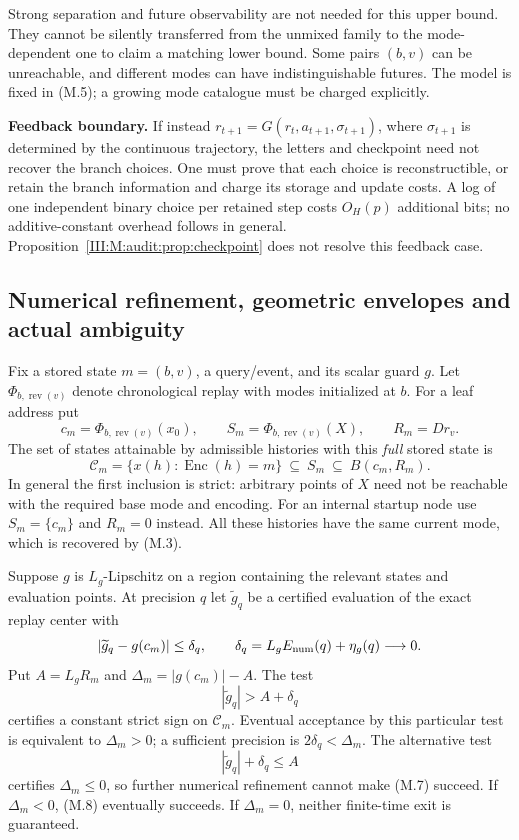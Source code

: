 Strong separation and future observability are not needed for this upper
bound. They cannot be silently transferred from the unmixed family to the
mode-dependent one to claim a matching lower bound. Some pairs $(b,v)$ can
be unreachable, and different modes can have indistinguishable futures.
The model is fixed in (M.5); a growing mode catalogue must be charged explicitly.

\textbf{Feedback boundary.} If instead
$r_{t+1}=G(r_t,a_{t+1},\sigma_{t+1})$, where $\sigma_{t+1}$ is determined
by the continuous trajectory, the letters and checkpoint need not recover
the branch choices. One must prove that each choice is reconstructible,
or retain the branch information and charge its storage and update costs.
A log of one independent binary choice per retained step costs
$O_H(p)$ additional bits; no additive-constant overhead follows in general.
Proposition~\ref{III:M:audit:prop:checkpoint} does not resolve this feedback case.

\subsection{Numerical refinement, geometric envelopes and actual ambiguity}
Fix a stored state $m=(b,v)$, a query/event, and its scalar guard $g$.
Let $\Phi_{b,\operatorname{rev}(v)}$ denote chronological replay with modes
initialized at $b$. For a leaf address put
\[
 c_m=\Phi_{b,\operatorname{rev}(v)}(x_0),\qquad
 S_m=\Phi_{b,\operatorname{rev}(v)}(X),\qquad R_m=Dr_v.
\]
The set of states attainable by admissible histories with this \emph{full}
stored state is
\[
 \mathcal C_m=\{x(h):\operatorname{Enc}(h)=m\}
       \ \subseteq\ S_m\ \subseteq\ B(c_m,R_m).       \tag{M.6}
\]
In general the first inclusion is strict: arbitrary points of $X$ need not
be reachable with the required base mode and encoding. For an internal
startup node use $S_m=\{c_m\}$ and $R_m=0$ instead. All these histories
have the same current mode, which is recovered by (M.3).

\begin{lemma}
\label{III:M:audit:lem:guard}
Suppose $g$ is $L_g$-Lipschitz on a region containing the relevant states and
evaluation points. At precision $q$ let $\widetilde g_q$ be a certified
evaluation of the exact replay center with
\[
 |\widetilde g_q-g(c_m)|\le\delta_q,
 \qquad \delta_q=L_gE_{\rm num}(q)+\eta_g(q)\longrightarrow0.
\]
Put $A=L_gR_m$ and $\Delta_m=|g(c_m)|-A$. The test
\[
 |\widetilde g_q|>A+\delta_q                          \tag{M.7}
\]
certifies a constant strict sign on $\mathcal C_m$. Eventual acceptance
by this particular test is equivalent to $\Delta_m>0$; a sufficient
precision is $2\delta_q<\Delta_m$.
The alternative test
\[
 |\widetilde g_q|+\delta_q\le A                      \tag{M.8}
\]
certifies $\Delta_m\le0$, so further numerical refinement cannot make
(M.7) succeed. If $\Delta_m<0$, (M.8) eventually succeeds. If $\Delta_m=0$,
neither finite-time exit is guaranteed.
\end{lemma}


